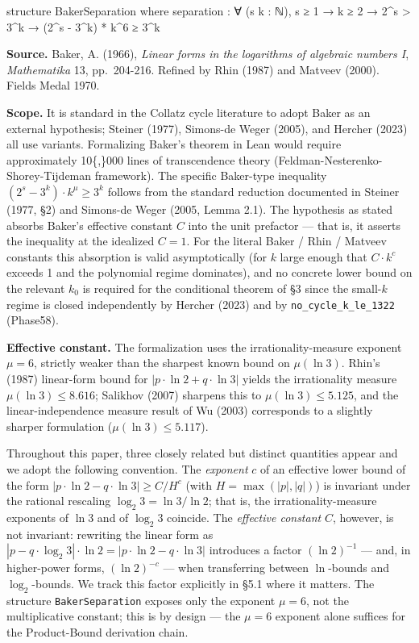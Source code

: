 \documentclass[
  11pt]{amsart}
\newenvironment{Shaded}{}{}
\newcommand{\NormalTok}[1]{#1}
\theoremstyle{plain}
\theoremstyle{definition}
\theoremstyle{remark}
\begin{document}
\begin{Shaded}
\begin{Highlighting}[]
\NormalTok{structure BakerSeparation where}
\NormalTok{  separation : ∀ (s k : ℕ), s ≥ 1 → k ≥ 2 → 2\^{}s \textgreater{} 3\^{}k →}
\NormalTok{    (2\^{}s {-} 3\^{}k) * k\^{}6 ≥ 3\^{}k}
\end{Highlighting}
\end{Shaded}

\textbf{Source.} Baker, A. (1966), \emph{Linear forms in the logarithms
of algebraic numbers I}, \emph{Mathematika} 13, pp.~204-216. Refined by
Rhin (1987) and Matveev (2000). Fields Medal 1970.

\textbf{Scope.} It is standard in the Collatz cycle literature to adopt
Baker as an external hypothesis; Steiner (1977), Simons-de Weger (2005),
and Hercher (2023) all use variants. Formalizing Baker's theorem in Lean
would require approximately 10\{,\}000 lines of transcendence theory
(Feldman-Nesterenko-Shorey-Tijdeman framework). The specific Baker-type
inequality \((2^s - 3^k) \cdot k^{\mu} \geq 3^k\) follows from the
standard reduction documented in Steiner (1977, §2) and Simons-de Weger
(2005, Lemma 2.1). The hypothesis as stated absorbs Baker's effective
constant \(C\) into the unit prefactor --- that is, it asserts the
inequality at the idealized \(C = 1\). For the literal Baker / Rhin /
Matveev constants this absorption is valid asymptotically (for \(k\)
large enough that \(C \cdot k^c\) exceeds 1 and the polynomial regime
dominates), and no concrete lower bound on the relevant \(k_0\) is
required for the conditional theorem of §3 since the small-\(k\) regime
is closed independently by Hercher (2023) and by
\texttt{no\_cycle\_k\_le\_1322} (Phase58).

\textbf{Effective constant.} The formalization uses the
irrationality-measure exponent \(\mu = 6\), strictly weaker than the
sharpest known bound on \(\mu(\ln 3)\). Rhin's (1987) linear-form bound
for \(|p \cdot \ln 2 + q \cdot \ln 3|\) yields the irrationality measure
\(\mu(\ln 3) \leq 8.616\); Salikhov (2007) sharpens this to
\(\mu(\ln 3) \leq 5.125\), and the linear-independence measure result of
Wu (2003) corresponds to a slightly sharper formulation
(\(\mu(\ln 3) \leq 5.117\)).

Throughout this paper, three closely related but distinct quantities
appear and we adopt the following convention. The \emph{exponent} \(c\)
of an effective lower bound of the form
\(|p \cdot \ln 2 - q \cdot \ln 3| \geq C / H^c\) (with
\(H = \max(|p|, |q|)\)) is invariant under the rational rescaling
\(\log_2 3 = \ln 3 / \ln 2\); that is, the irrationality-measure
exponents of \(\ln 3\) and of \(\log_2 3\) coincide. The \emph{effective
constant} \(C\), however, is not invariant: rewriting the linear form as
\(|p - q \cdot \log_2 3| \cdot \ln 2 = |p \cdot \ln 2 - q \cdot \ln 3|\)
introduces a factor \((\ln 2)^{-1}\) --- and, in higher-power forms,
\((\ln 2)^{-c}\) --- when transferring between \(\ln\)-bounds and
\(\log_2\)-bounds. We track this factor explicitly in §5.1 where it
matters. The structure \texttt{BakerSeparation} exposes only the
exponent \(\mu = 6\), not the multiplicative constant; this is by design
--- the \(\mu = 6\) exponent alone suffices for the Product-Bound
derivation chain.
\end{document}
